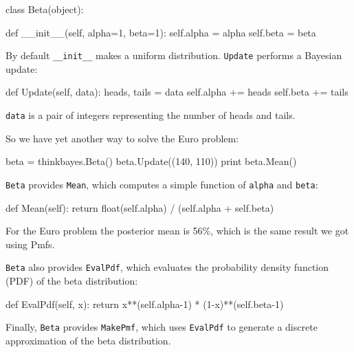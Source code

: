 \documentclass[12pt]{book}
\theoremstyle{exercise}
\newcommand{\py}[1]{{\tt #1}}%
\begin{document}
\begin{code}
class Beta(object):

    def __init__(self, alpha=1, beta=1):
        self.alpha = alpha
        self.beta = beta
\end{code}

By default \verb"__init__" makes a uniform distribution.
\py{Update} performs a Bayesian update:

\begin{code}
    def Update(self, data):
        heads, tails = data
        self.alpha += heads
        self.beta += tails
\end{code}

\py{data} is a pair of integers representing the number of
heads and tails.

So we have yet another way to solve the Euro problem:

\begin{code}
    beta = thinkbayes.Beta()
    beta.Update((140, 110))
    print beta.Mean()
\end{code}

\py{Beta} provides \py{Mean}, which
computes a simple function of \py{alpha}
and \py{beta}:

\begin{code}
    def Mean(self):
        return float(self.alpha) / (self.alpha + self.beta)
\end{code}

For the Euro problem the posterior mean is 56\%, which is the
same result we got using Pmfs.

\py{Beta} also provides \py{EvalPdf}, which evaluates
the probability density
function (PDF)  of the beta distribution:

\begin{code}
    def EvalPdf(self, x):
        return x**(self.alpha-1) * (1-x)**(self.beta-1)
\end{code}

Finally, \py{Beta} provides \py{MakePmf}, which
uses \py{EvalPdf} to generate a discrete approximation
of the beta distribution.



\end{document}
